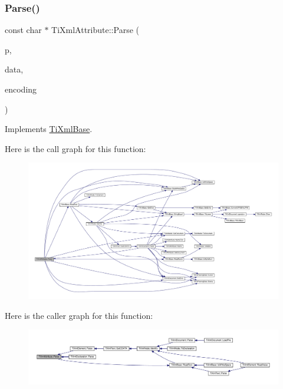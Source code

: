 \subsubsection{\texorpdfstring{Parse()}{Parse()}}
{\footnotesize\ttfamily const char $\ast$ Ti\+Xml\+Attribute\+::\+Parse (\begin{DoxyParamCaption}\item[{const char $\ast$}]{p,  }\item[{\hyperlink{class_ti_xml_parsing_data}{Ti\+Xml\+Parsing\+Data} $\ast$}]{data,  }\item[{\hyperlink{tinyxml_8h_a88d51847a13ee0f4b4d320d03d2c4d96}{Ti\+Xml\+Encoding}}]{encoding }\end{DoxyParamCaption})\hspace{0.3cm}{\ttfamily [virtual]}}



Implements \hyperlink{class_ti_xml_base_a00e4edb0219d00a1379c856e5a1d2025}{Ti\+Xml\+Base}.

Here is the call graph for this function\+:\nopagebreak
\begin{figure}[H]
\begin{center}
\leavevmode
\includegraphics[width=350pt]{class_ti_xml_attribute_ad62774421b814894b995af3b5d231dda_cgraph}
\end{center}
\end{figure}
Here is the caller graph for this function\+:\nopagebreak
\begin{figure}[H]
\begin{center}
\leavevmode
\includegraphics[width=350pt]{class_ti_xml_attribute_ad62774421b814894b995af3b5d231dda_icgraph}
\end{center}
\end{figure}
\mbox{\label{class_ti_xml_attribute_afc7bbfdf83d59fbc4ff5e283d27b5d7d}} 
